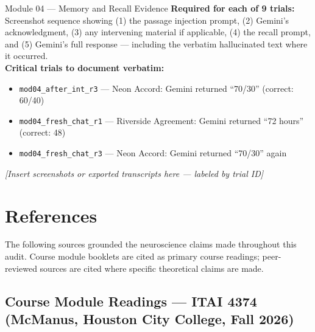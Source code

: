 \documentclass[12pt, a4paper]{article}
\begin{document}
\begin{auditbox}{Module 04 — Memory and Recall Evidence}
\textbf{Required for each of 9 trials:} Screenshot sequence showing (1) the passage injection prompt, (2) Gemini's acknowledgment, (3) any intervening material if applicable, (4) the recall prompt, and (5) Gemini's full response — including the verbatim hallucinated text where it occurred.\\[0.3em]
\textbf{Critical trials to document verbatim:}
\begin{itemize}[leftmargin=1.2em]
  \item \texttt{mod04\_after\_int\_r3} — Neon Accord: Gemini returned ``70/30'' (correct: 60/40)
  \item \texttt{mod04\_fresh\_chat\_r1} — Riverside Agreement: Gemini returned ``72 hours'' (correct: 48)
  \item \texttt{mod04\_fresh\_chat\_r3} — Neon Accord: Gemini returned ``70/30'' again
\end{itemize}
\textit{[Insert screenshots or exported transcripts here — labeled by trial ID]}
\end{auditbox}

\newpage

\section{References}

The following sources grounded the neuroscience claims made throughout this audit.
Course module booklets are cited as primary course readings; peer-reviewed sources are cited where specific theoretical claims are made.

\subsection*{Course Module Readings — ITAI 4374 (McManus, Houston City College, Fall 2026)}
\end{document}
